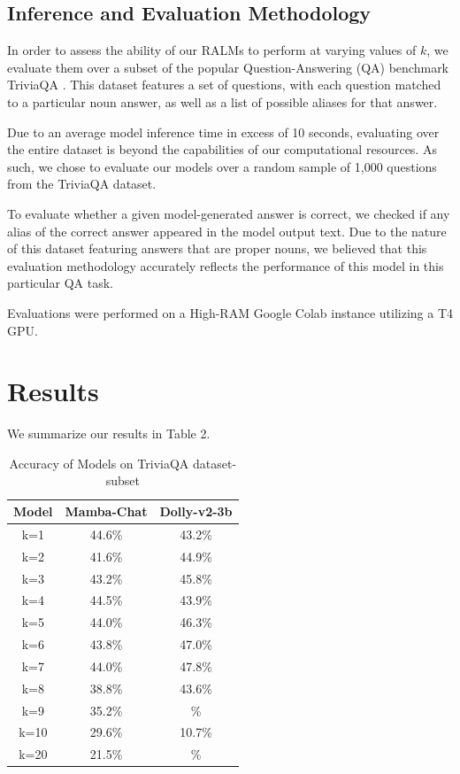 \documentclass[11pt]{article}
\begin{document}
\subsection{Inference and Evaluation Methodology}
In order to assess the ability of our RALMs to perform at varying values of $k$, we evaluate them over a subset of the popular Question-Answering (QA) benchmark TriviaQA \cite{Joshi2017TriviaQAAL}. This dataset features a set of questions, with each question matched to a particular noun answer, as well as a list of possible aliases for that answer.

Due to an average model inference time in excess of 10 seconds, evaluating over the entire dataset is beyond the capabilities of our computational resources. As such, we chose to evaluate our models over a random sample of 1,000 questions from the TriviaQA dataset.

To evaluate whether a given model-generated answer is correct, we checked if any alias of the correct answer appeared in the model output text. Due to the nature of this dataset featuring answers that are proper nouns, we believed that this evaluation methodology accurately reflects the performance of this model in this particular QA task.

Evaluations were performed on a High-RAM Google Colab instance utilizing a T4 GPU.
\section{Results}
We summarize our results in Table 2.
\begin{table}[h]
    \centering
    \begin{tabular}{|c|c|c|} 
     \hline
     \textbf{Model} & Mamba-Chat & Dolly-v2-3b \\
     \hline\hline
     k=1 & 44.6\% & 43.2\% \\ 
     \hline
     k=2 & 41.6\% & 44.9\% \\
     \hline
     k=3 & 43.2\% & 45.8\% \\
     \hline
     k=4 & 44.5\% & 43.9\% \\
     \hline
     k=5 & 44.0\% & 46.3\% \\
     \hline
     k=6 & 43.8\% & 47.0\% \\
     \hline
     k=7 & 44.0\% & 47.8\% \\
     \hline
     k=8 & 38.8\% & 43.6\% \\
     \hline
     k=9 & 35.2\% & \% \\
     \hline
     k=10 & 29.6\% & 10.7\% \\
     \hline
     k=20 & 21.5\% & \% \\
     \hline
    \end{tabular}
    \caption{Accuracy of Models on TriviaQA dataset-subset}
    \label{tab:my_label}
\end{table}
\newline
\end{document}
